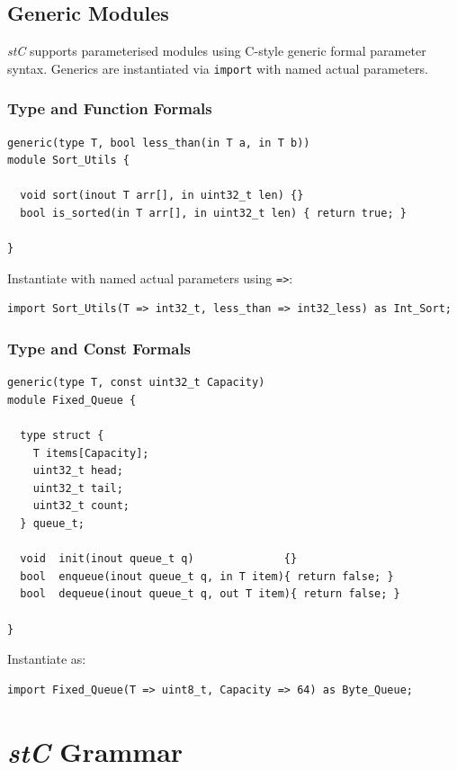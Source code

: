 \documentclass[11pt,letterpaper,twoside,openany]{book}
\begin{document}
\section{Generic Modules}
\emph{stC} supports parameterised modules using C-style generic formal parameter
syntax.  Generics are instantiated via \verb'import' with named actual
parameters.

\subsection{Type and Function Formals}

\begin{lstlisting}
generic(type T, bool less_than(in T a, in T b))
module Sort_Utils {

  void sort(inout T arr[], in uint32_t len) {}
  bool is_sorted(in T arr[], in uint32_t len) { return true; }

}
\end{lstlisting}

Instantiate with named actual parameters using \verb'=>':

\begin{lstlisting}
import Sort_Utils(T => int32_t, less_than => int32_less) as Int_Sort;
\end{lstlisting}

\subsection{Type and Const Formals}

\begin{lstlisting}
generic(type T, const uint32_t Capacity)
module Fixed_Queue {

  type struct {
    T items[Capacity];
    uint32_t head;
    uint32_t tail;
    uint32_t count;
  } queue_t;

  void  init(inout queue_t q)              {}
  bool  enqueue(inout queue_t q, in T item){ return false; }
  bool  dequeue(inout queue_t q, out T item){ return false; }

}
\end{lstlisting}

Instantiate as:

\begin{lstlisting}
import Fixed_Queue(T => uint8_t, Capacity => 64) as Byte_Queue;
\end{lstlisting}

\appendix

\chapter{\emph{stC} Grammar}
\end{document}
